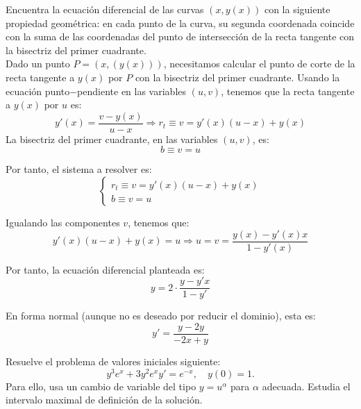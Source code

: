 \documentclass[12pt]{article}
\begin{document}
\begin{ejercicio}
    Encuentra la ecuación diferencial de las curvas $(x,y(x))$ con la siguiente propiedad geométrica: en cada punto de la curva, su segunda coordenada coincide con la suma de las coordenadas del punto de intersección de la recta tangente con la bisectriz del primer cuadrante.\\

    Dado un punto $P=(x,(y(x)))$, necesitamos calcular el punto de corte de la recta tangente a $y(x)$ por $P$ con la bisectriz del primer cuadrante. Usando la ecuación punto$-$pendiente en las variables $(u,v)$, tenemos que la recta tangente a $y(x)$ por $u$ es:
    \begin{equation*}
        y'(x)=\dfrac{v-y(x)}{u-x}
        \Longrightarrow
        r_t\equiv v = y'(x)(u-x) + y(x)
    \end{equation*}
    La bisectriz del primer cuadrante, en las variables $(u,v)$, es:
    \begin{equation*}
        b\equiv v=u
    \end{equation*}

    Por tanto, el sistema a resolver es:
    \begin{equation*}
        \begin{cases}
            r_t\equiv v = y'(x)(u-x) + y(x)\\
            b\equiv v=u
        \end{cases}
    \end{equation*}

    Igualando las componentes $v$, tenemos que:
    \begin{equation*}
        y'(x)(u-x) + y(x)=u \Longrightarrow
        u=v=\dfrac{y(x)-y'(x)x}{1-y'(x)}
    \end{equation*}

    Por tanto, la ecuación diferencial planteada es:
    \begin{equation*}
        y=2\cdot \dfrac{y-y'x}{1-y'}
    \end{equation*}

    En forma normal (aunque no es deseado por reducir el dominio), esta es:
    \begin{equation*}
        y'=\dfrac{y-2y}{-2x+y}
    \end{equation*}
\end{ejercicio}

\begin{ejercicio}
    Resuelve el problema de valores iniciales siguiente:
    \begin{equation*}
        y^3e^x+3y^2e^xy'=e^{-x},\quad y(0)=1.
    \end{equation*}
    Para ello, usa un cambio de variable del tipo $y=u^{\alpha}$ para $\alpha$ adecuada. Estudia el intervalo maximal de definición de la solución.
\end{ejercicio}
\end{document}
